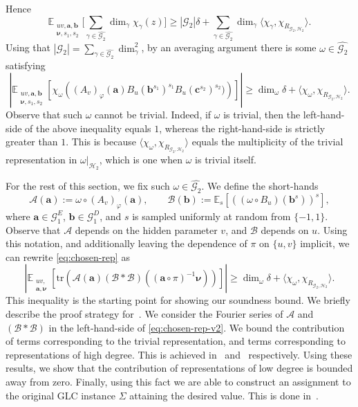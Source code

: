 \documentclass[a4paper,11pt]{article}
\theoremstyle{definition}
\newcommand{\tuple}[1]{{\mathbf{#1}}}
\newcommand{\ex}[1]{\mathbb{E}_{#1}}
\newcommand{\gr}{\mathscr{G}}
\newcommand{\sgr}{\mathscr{H}}
\newcommand{\ba}{\mathbf{a}}
\newcommand{\bb}{\mathbf{b}}
\newcommand{\bc}{\mathbf{c}}
\newcommand{\tr}{\mathrm{tr}}
\newcommand{\A}{\mathcal{A}}
\newcommand{\B}{\mathcal{B}}
\begin{document}
Hence
\[
\ex{\substack{uv,\tuple{a},\tuple{b}\\ \bm{\nu},s_1,s_2}}  
\Big[ 
\sum_{\gamma \in \widehat{\gr_2}} \dim_\gamma \chi_{\gamma}(z) 
 \Big] \geq
|\gr_2|\delta +
\sum_{\gamma \in \widehat{\gr_2}}
\dim_\gamma \langle \chi_\gamma, \chi_{R_{\gr_2,\sgr_2}}\rangle.
\]
Using that $|\gr_2| = \sum_{\gamma\in \widehat{\gr_2}} \dim_\gamma^2$, by an averaging argument there is some $\omega\in \widehat{\gr_2}$ satisfying
\begin{equation}\label{eq:chosen-rep}
\left| \ex{\substack{uv,\tuple{a},\tuple{b}\\ \bm{\nu},s_1,s_2}}\left[ \chi_{\omega}\left((A_v)_{\varphi}(\ba)B_u(\bb^{s_1})^{s_1}B_u(\bc^{s_2})^{s_2}) \right) \right] \right| \geq  \dim_\omega\delta 
+ \langle \chi_\omega, \chi_{R_{\gr_2,\sgr_2}} \rangle.
\end{equation}
Observe that such $\omega$ cannot be trivial. Indeed, if $\omega$ is trivial, then the left-hand-side of the above inequality equals $1$, whereas the right-hand-side is strictly greater than $1$. This is because
$\langle \chi_\omega, \chi_{R_{\gr_2,\sgr_2}} \rangle$ equals the multiplicity of the trivial representation in $\omega\vert_{\sgr_2}$, which is one when $\omega$ is trivial itself.

For the rest of this section, we fix such $\omega\in \widehat{\gr_2}$.
We define the short-hands 
\begin{equation} \label{eq:shorthands}
    \A(\ba):= \omega \circ (A_v)_\varphi(\ba), \quad \quad \B(\bb):= \ex{s} [ ((\omega \circ B_u)(\bb^s))^s],
\end{equation}
where $\ba \in \gr_1^E$, $\bb \in \gr_1^D$, and $s$ is sampled uniformly at random from $\{-1,1\}$. Observe that $\A$ depends on the hidden parameter $v$, and $\B$ depends on $u$. Using this notation, and additionally leaving the dependence of $\pi$ on $\{u,v\}$ implicit, we can rewrite \eqref{eq:chosen-rep} as 
\begin{equation}
    \label{eq:chosen-rep-v2}
\left| \ex{\substack{uv,\\ \tuple{a}, \bm{\nu}}}\left[ \tr\left( \A(\ba)(\B*\B)((\ba\circ\pi)^{-1} \bm{\nu}) \right) \right] \right| \geq  \dim_\omega\delta 
+ \langle \chi_\omega, \chi_{R_{\gr_2,\sgr_2}} \rangle.    
\end{equation}
This inequality is the starting point for showing our soundness bound. We briefly describe the proof strategy for~. We consider the Fourier series of $\A$ and $(\B*\B)$ in the left-hand-side of \eqref{eq:chosen-rep-v2}. We bound the contribution of terms corresponding to the trivial representation, and terms corresponding to representations 
of high degree. 
This is achieved in~ and~ respectively. Using these results, we show that the contribution of representations 
of low degree is bounded away from zero. Finally, using this fact we are able to construct an assignment to the original GLC instance $\Sigma$ attaining the desired value. This is done in~.\par
\end{document}
